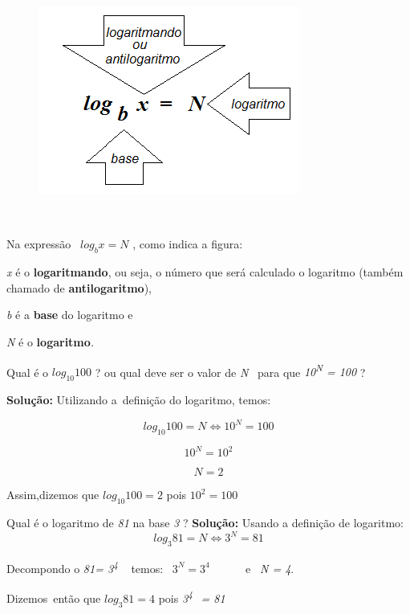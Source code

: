 \begin{figure}[H]
	\begin{Center}
		\includegraphics[width=3.39in,height=2.44in]{capitulos/logaritmos_e_funcao_logaritmica/media/image2.png}
	\end{Center}
\end{figure}

~~

Na expressão~  \( log_{b}x=N \) , como indica a figura:

\textit{x} é o \textbf{logaritmando}, ou seja, o número que será calculado o logaritmo (também chamado de \textbf{antilogaritmo}),

\textit{b }é a \textbf{base} do logaritmo e

\textit{N }é o \textbf{logaritmo}\textit{.}

\begin{texemplo}
    Qual é o  \( log_{10}100 \)  ? ou qual deve ser o valor de \textit{N}~ para que \textit{10\textsuperscript{N} = 100} ?

    \textbf{Solução:} Utilizando a~definição do logaritmo, temos:  

    \[ log_{10}100=N \Leftrightarrow  10^{N}=100 \]

    \[ 10^{N}=10^{2} \] 

    \[ N=2 \]

Assim,dizemos que \( log_{10}100=2 \) pois \( 10^{2}=100 \) \qedsymbol{}
\end{texemplo}

\begin{texemplo}
    Qual é o logaritmo de \textit{81 }na base \textit{3} ?
    \textbf{Solução:} Usando a definição de logaritmo: \[ log_{3}81=N \Leftrightarrow 3^{N}=81 \] 

    Decompondo o \textit{81= 3\textsuperscript{4}}\textsuperscript{~~ }temos:~  \( 3^{N}=3^{4} \) ~~~~~ e~ \textit{N = 4}. 

    Dizemos~então que   \( log_{3}81=4  \)  pois  \textit{ 3\textsuperscript{4}}\textsuperscript{~ }\textit{= 81}\qedsymbol{}

\end{texemplo}

